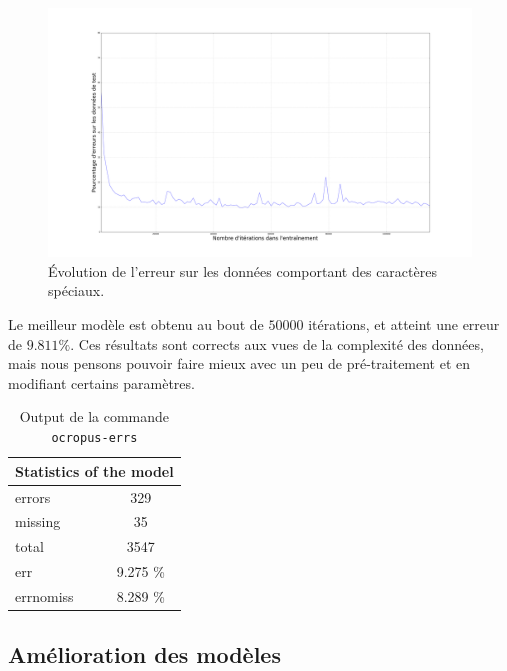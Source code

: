 \documentclass{report}
\begin{document}
\begin{figure}[!h] 
    \center
    \includegraphics[width=13cm]{error_default.png}
    \caption{Évolution de l'erreur sur les données comportant des caractères spéciaux.}
    \label{err_default}
\end{figure}

Le meilleur modèle est obtenu au bout de $50 000$ itérations, et atteint une erreur de $9.811\%$.
Ces résultats sont corrects aux vues de la complexité des données, mais nous pensons pouvoir faire mieux avec un peu de pré-traitement et en modifiant certains paramètres.

\begin{table}[!h]
    \centering
    \begin{tabular}{|l|l|lc|l|l|}
        \hline
        \multicolumn{6}{|c|}{\cellcolor[gray]{0.8}Statistics of the model} \\ \hline
        \multicolumn{3}{|l|}{errors}    & \multicolumn{3}{c|}{329}         \\ \hline
        \multicolumn{3}{|l|}{missing}   & \multicolumn{3}{c|}{35}          \\ \hline
        \multicolumn{3}{|l|}{total}     & \multicolumn{3}{c|}{3547}        \\ \hline
        \multicolumn{3}{|l|}{err}       & \multicolumn{3}{c|}{9.275 \%}    \\ \hline
        \multicolumn{3}{|l|}{errnomiss} & \multicolumn{3}{c|}{8.289 \%}    \\ \hline
    \end{tabular}
    \caption{Output de la commande \texttt{ocropus-errs}}
    \label{t1}
\end{table}

\subsection{Amélioration des modèles}
\end{document}
